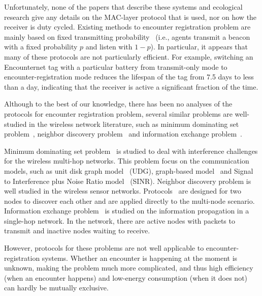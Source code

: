 Unfortunately, none of the papers that describe these systems and 
ecological research give any details on the
MAC-layer protocol that is used, nor on how the receiver is duty cycled. 
Existing methods to encounter registration problem are mainly based on fixed transmitting 
probability~\cite{Menhill2012NovelTelemetry,Rutz2012AutomatedMapping}
(i.e., agents transmit a beacon with a fixed probability $p$ and listen with $1-p$). 
In particular, it appears that many of these 
protocols are not particularly efficient. For example, switching 
an Encounternet tag with a particular battery from
transmit-only mode 
to encounter-registration mode reduces the lifespan
of the tag from 7.5 days to less than a day, indicating that the 
receiver is active a significant fraction of the time.

Although to the best of our knowledge, there has been no analyses of the protocols 
for encounter registration problem,
several similar problems are well-studied in the wireless network literature, 
such as  
minimum dominating set problem~\cite{Scheideler2008An,Yu2013Review},
neighbor discovery problem~\cite{Bakht2012Searchlight, Sun2014Hello,Chen2015On}
and information exchange problem~\cite{Capetanakis1979Tree,Daum2013Maximal,Yu2017Uniform}.

Minimum dominating set problem~\cite{Scheideler2008An,Yu2013Review} is studied to 
deal with interference challenges for the wireless multi-hop networks.
This problem focus on the communication models, such as unit disk graph model~\cite{Lebhar2009Unit} (UDG),
graph-based model~\cite{De2007A} and Signal to Interference plus Noise Ratio model~\cite{Lee2007Signal} (SINR).
Neighbor discovery problem is well studied in the wireless sensor 
networks. Protocols~\cite{Bakht2012Searchlight, Sun2014Hello,Chen2015On} 
are designed for two nodes to discover each other and 
are applied directly to the multi-node scenario.
Information exchange problem~\cite{Capetanakis1979Tree,Daum2013Maximal,Yu2017Uniform} is 
studied on the information propagation in a single-hop network. 
In the network, there are active nodes with packets to transmit 
and inactive nodes waiting to receive.

However, protocols for these problems are not well applicable to encounter-registration systems.
Whether an encounter is happening at the moment is unknown, making the problem much more complicated,
and thus high efficiency (when an encounter happens)
and low-energy consumption (when it does not) 
can hardly be mutually exclusive.

